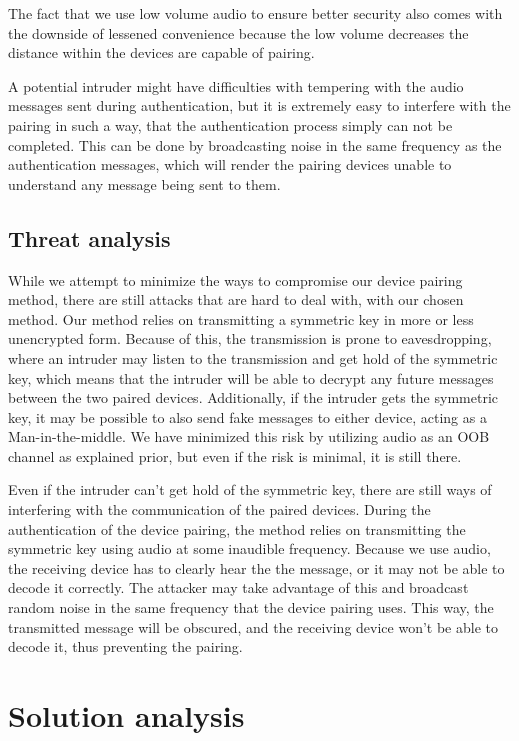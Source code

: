 \documentclass[12pt]{article}
\begin{document}
The fact that we use low volume audio to ensure better security also comes with the downside of lessened convenience because the low volume decreases the distance within the devices are capable of pairing.

A potential intruder might have difficulties with tempering with the audio messages sent during authentication, but it is extremely easy to interfere with the pairing in such a way, that the authentication process simply can not be completed. This can be done by broadcasting noise in the same frequency as the authentication messages, which will render the pairing devices unable to understand any message being sent to them.


\subsection{Threat analysis}
\label{sub:Threat analysis}

While we attempt to minimize the ways to compromise our device pairing method, there are still attacks that are hard to deal with, with our chosen method. Our method relies on transmitting a symmetric key in more or less unencrypted form. Because of this, the transmission is prone to eavesdropping, where an intruder may listen to the transmission and get hold of the symmetric key, which means that the intruder will be able to decrypt any future messages between the two paired devices. Additionally, if the intruder gets the symmetric key, it may be possible to also send fake messages to either device, acting as a Man-in-the-middle. We have minimized this risk by utilizing audio as an OOB channel as explained prior, but even if the risk is minimal, it is still there.

Even if the intruder can't get hold of the symmetric key, there are still ways of interfering with the communication of the paired devices. During the authentication of the device pairing, the method relies on transmitting the symmetric key using audio at some inaudible frequency. Because we use audio, the receiving device has to clearly hear the the message, or it may not be able to decode it correctly. The attacker may take advantage of this and broadcast random noise in the same frequency that the device pairing uses. This way, the transmitted message will be obscured, and the receiving device won't be able to decode it, thus preventing the pairing.

\section{Solution analysis}
\end{document}
